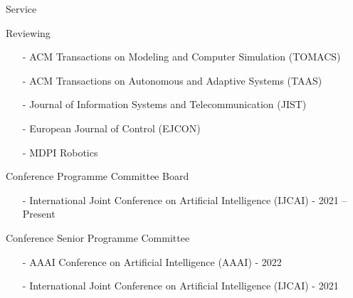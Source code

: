 \begin{rSection}{Service}
\begin{rSubsection}{Reviewing}{}{}{}
\begin{itemize}
\item[-] ACM Transactions on Modeling and Computer Simulation (TOMACS)\vspace*{-0.2cm}
\item[-] ACM Transactions on Autonomous and Adaptive Systems (TAAS)\vspace*{-0.2cm}
\item[-] Journal of Information Systems and Telecommunication (JIST)\vspace*{-0.2cm}
\item[-] European Journal of Control  (EJCON)\vspace*{-0.2cm}
\item[-] MDPI Robotics
\end{itemize}

\item{Conference Programme Committee Board}
\begin{itemize}
\vspace*{-0.2cm}
\item[-]  International Joint Conference on Artificial Intelligence (IJCAI) - 2021 -- Present
\end{itemize}

\item{Conference Senior Programme Committee}
\begin{itemize}
\vspace*{-0.2cm}
\item[-]  AAAI Conference on Artificial Intelligence (AAAI) - 2022\vspace*{-0.2cm}
\item[-]  International Joint Conference on Artificial Intelligence (IJCAI) - 2021
\end{itemize}


\end{rSubsection}
\end{rSection}
